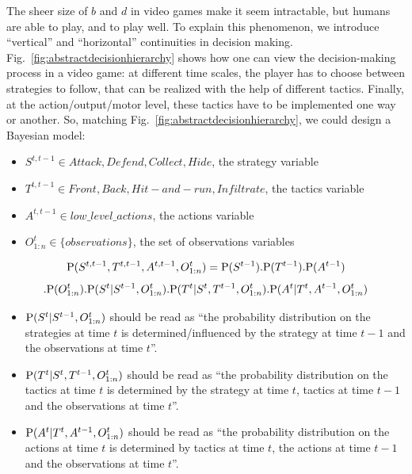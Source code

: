 The sheer size of $b$ and $d$ in video games make it seem intractable, but humans are able to play, and to play well. To explain this phenomenon, we introduce ``vertical'' and ``horizontal'' continuities in decision making. Fig.~\ref{fig:abstractdecisionhierarchy} shows how one can view the decision-making process in a video game: at different time scales, the player has to choose between strategies to follow, that can be realized with the help of different tactics. Finally, at the action/output/motor level, these tactics have to be implemented one way or another. So, matching Fig.~\ref{fig:abstractdecisionhierarchy}, we could design a Bayesian model:
\begin{itemize}
\item $S^{t,t-1} \in {Attack,Defend,Collect,Hide}$, the strategy variable
\item $T^{t,t-1} \in {Front,Back,Hit-and-run,Infiltrate}$, the tactics variable
\item $A^{t,t-1} \in {low\_level\_actions}$, the actions variable
\item $O_{1:n}^{t} \in \{observations\}$, the set of observations variables
\end{itemize}
$$\mathrm{P}(S^{t,t-1},T^{t,t-1},A^{t,t-1},O_{1:n}^t) = \mathrm{P}(S^{t-1}).\mathrm{P}(T^{t-1}).\mathrm{P}(A^{t-1})$$
$$.\mathrm{P}(O_{1:n}^t).\mathrm{P}(S^t|S^{t-1},O_{1:n}^t).\mathrm{P}(T^t|S^t,T^{t-1},O_{1:n}^t).\mathrm{P}(A^t|T^t,A^{t-1},O_{1:n}^t)$$
\begin{itemize}
    \item $\mathrm{P}(S^t|S^{t-1},O_{1:n}^t)$ should be read as ``the probability distribution on the strategies at time $t$ is determined/influenced by the strategy at time $t-1$ and the observations at time $t$''.
    \item $\mathrm{P}(T^t|S^t,T^{t-1},O_{1:n}^t)$ should be read as ``the probability distribution on the tactics at time $t$ is determined by the strategy at time $t$, tactics at time $t-1$ and the observations at time $t$''.
    \item $\mathrm{P}(A^t|T^t,A^{t-1},O_{1:n}^t)$ should be read as ``the probability distribution on the actions at time $t$ is determined by tactics at time $t$, the actions at time $t-1$ and the observations at time $t$''.
\end{itemize}

